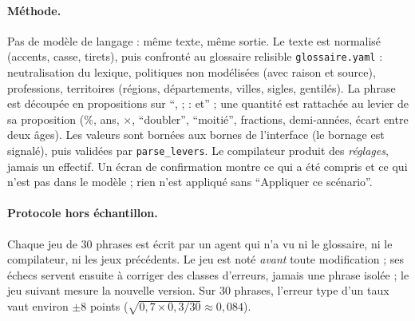 \paragraph{Méthode.}
Pas de modèle de langage : même texte, même sortie.
Le texte est normalisé (accents, casse, tirets), puis confronté au glossaire relisible \texttt{glossaire.yaml} : neutralisation du lexique, politiques non modélisées (avec raison et source), professions, territoires (régions, départements, villes, sigles, gentilés).
La phrase est découpée en propositions sur \enquote{, ; : et} ; une quantité est rattachée au levier de sa proposition (\%, ans, $\times$, \enquote{doubler}, \enquote{moitié}, fractions, demi-années, écart entre deux âges).
Les valeurs sont bornées aux bornes de l'interface (le bornage est signalé), puis validées par \texttt{parse\_\allowbreak{}levers}.
Le compilateur produit des \emph{réglages}, jamais un effectif. Un écran de confirmation montre ce qui a été compris et ce qui n'est pas dans le modèle ; rien n'est appliqué sans \enquote{Appliquer ce scénario}.

\paragraph{Protocole hors échantillon.}
Chaque jeu de 30\mesure{} phrases est écrit par un agent qui n'a vu ni le glossaire, ni le compilateur, ni les jeux précédents.
Le jeu est noté \emph{avant} toute modification ; ses échecs servent ensuite à corriger des classes d'erreurs, jamais une phrase isolée ; le jeu suivant mesure la nouvelle version.
Sur 30\mesure{} phrases, l'erreur type d'un taux vaut environ $\pm 8$\derive{} points ($\sqrt{0{,}7\times0{,}3/30}\approx0{,}084$).

